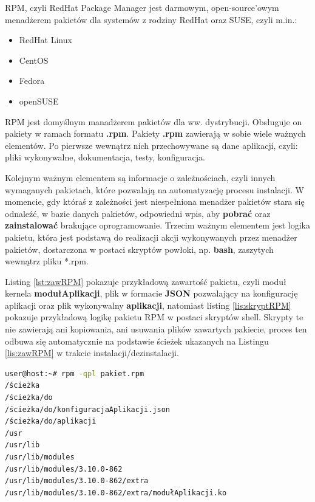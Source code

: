 \newpage
RPM, czyli RedHat Package Manager jest darmowym, open-source'owym menadżerem pakietów dla systemów z rodziny RedHat oraz SUSE, czyli m.in.:
\begin{itemize}
\item RedHat Linux
\item CentOS
\item Fedora
\item openSUSE
\end{itemize}\par
RPM jest domyślnym manadżerem pakietów dla ww. dystrybucji. Obsługuje on pakiety w ramach formatu \textbf{.rpm}. Pakiety \textbf{.rpm} zawierają w sobie wiele ważnych elementów. Po pierwsze wewnątrz nich przechowywane są dane aplikacji, czyli: pliki wykonywalne, dokumentacja, testy, konfiguracja.\par 
Kolejnym ważnym elementem są informacje o zależnościach, czyli innych wymaganych pakietach, które pozwalają na automatyzację procesu instalacji. W momencie, gdy któraś z zależności jest niespełniona menadżer pakietów stara się odnaleźć, w bazie danych pakietów, odpowiedni wpis, aby \textbf{pobrać} oraz \textbf{zainstalować} brakujące oprogramowanie. Trzecim ważnym elementem jest logika pakietu, która jest podstawą do realizacji akcji wykonywanych przez menadżer pakietów, dostarczona w postaci skryptów powłoki, np. \textbf{bash}, zaszytych wewnątrz pliku *.rpm.

Listing \ref{lst:zawRPM} pokazuje przykładową zawartość pakietu, czyli moduł kernela \textbf{modułAplikacji}, plik w formacie \textbf{JSON} pozwalający na konfigurację aplikacji oraz plik wykonywalny \textbf{aplikacji}, natomiast  listing \ref{lis:skryptRPM} pokazuje przykładową logikę pakietu RPM w postaci skryptów shell. Skrypty te nie zawierają ani kopiowania, ani usuwania plików zawartych pakiecie, proces ten odbuwa się automatycznie na podstawie ścieżek ukazanych na Listingu \ref{lis:zawRPM} w trakcie instalacji/dezinstalacji.

\begin{lstlisting}[language=bash,caption={Przykładowa zawartość pakietu RPM},label={lst:zawRPM}]
user@host:~# rpm -qpl pakiet.rpm
/ścieżka
/ścieżka/do
/ścieżka/do/konfiguracjaAplikacji.json
/ścieżka/do/aplikacji
/usr
/usr/lib
/usr/lib/modules
/usr/lib/modules/3.10.0-862
/usr/lib/modules/3.10.0-862/extra
/usr/lib/modules/3.10.0-862/extra/modułAplikacji.ko
\end{lstlisting}

\newpage

